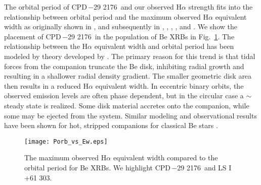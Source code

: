 \documentclass[]{aastex631}
\newcommand{\target}{CPD\,$-$29 2176}
\begin{document}
The orbital period of \target\ and our observed H$\alpha$ strength fits into the relationship between orbital period and the maximum observed H$\alpha$ equivalent width as originally shown in \citet{1997A&A...322..193R}, and subsequently in \citet{2007MNRAS.377..867R}, \citet{Reig2011}, \citet{2009ApJ...707.1080A}, \citet{2015MNRAS.452..969C}, and \citet{2016A&A...590A.122R}. We show the placement of \target\ in the population of Be XRBs in Fig.~\ref{fig:porb-ew}.
The relationship between the H$\alpha$ equivalent width and orbital period has been modeled by theory developed by \citet{2002MNRAS.337..967O}. 
The primary reason for this trend is that tidal forces from the companion truncate the Be disk, inhibiting radial growth and resulting in a shallower radial density gradient. The smaller geometric disk area then results in a reduced H$\alpha$ equivalent width. In eccentric binary orbits, the observed emission levels are often phase dependent, but in the circular case a $\sim$steady state is realized. Some disk material accretes onto the companion, while some may be ejected from the system.
Similar modeling and observational results have been shown for hot, stripped companions for classical Be stars \citep[e.g.,][]{2017ApJ...836..112D, 2019ApJ...885..147K}.


\begin{figure}
    \centering
    \texttt{[image: Porb\_vs\_Ew.eps]}
    \caption{The maximum observed H$\alpha$ equivalent width compared to the orbital period for Be XRBs. We highlight \target\ and LS I +61 303.}
    \label{fig:porb-ew}
\end{figure}
\end{document}
